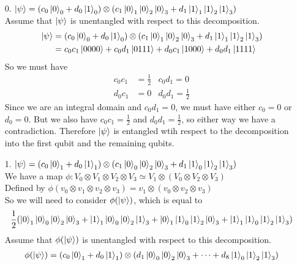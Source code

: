 \documentclass[11pt]{article}
\def\haf{\frac{1}{2}}
\begin{document}
\begin{itemize}
    \begin{enumerate}
        \item[0.] $\ket{\psi} = (c_0\ket{0}_0 + d_0\ket{1}_0) \otimes (c_1\ket{0}_1\ket{0}_2\ket{0}_3 + d_1\ket{1}_1\ket{1}_2\ket{1}_3)$ \\
            Assume that $\ket{\psi}$ is unentangled with respect to this decomposition.
            \begin{align*} 
                \ket{\psi} 
                &= (c_0\ket{0}_0 + d_0\ket{1}_0) \otimes (c_1\ket{0}_1\ket{0}_2\ket{0}_3 + d_1\ket{1}_1\ket{1}_2\ket{1}_3) \\
                &= c_0c_1\ket{0000} + c_0d_1\ket{0111}  + d_0c_1\ket{1000} + d_0d_1\ket{1111}
            \end{align*}
            So we must have
            \begin{align*}
                c_0c_1 &= \haf & c_0d_1 = 0 \\
                d_0c_1 &= 0 & d_0d_1 = \haf 
            \end{align*}
            Since we are an integral domain and $c_0d_1 = 0$, we must have either $c_0 = 0$ or $d_0 = 0$. 
            But we also have $c_0c_1 = \haf$ and $d_0d_1 = \haf$, so either way we have a contradiction.
            Therefore $\ket{\psi}$ is entangled wtih respect to the decomposition into the first qubit and the remaining qubits.
            \newpage
        \item[1.]
        $\ket{\psi} = (c_0\ket{0}_1 + d_0\ket{1}_1) 
        \otimes (c_1\ket{0}_0\ket{0}_2\ket{0}_3 + d_1\ket{1}_0\ket{1}_2\ket{1}_3)$ \\
            We have a map $\phi : V_0 \otimes V_1 \otimes V_2 \otimes V_3 \simeq V_1 \otimes (V_0 \otimes V_2 \otimes V_3)$ \\
            Defined by $\phi(v_0 \otimes v_1 \otimes v_2 \otimes v_3) = v_1 \otimes (v_0 \otimes v_2 \otimes v_3) $ \\
            So we will need to consider $\phi(\ket{\psi})$, which is equal to 
            $$\haf(\ket{0}_1\ket{0}_0\ket{0}_2\ket{0}_3 + \ket{1}_1\ket{0}_0\ket{0}_2\ket{1}_3 + \ket{0}_1\ket{1}_0\ket{1}_2\ket{0}_3 + \ket{1}_1 \ket{1}_0\ket{1}_2\ket{1}_3)$$
            Assume that $\phi(\ket{\psi})$ is unentangled with respect to this decomposition.
            \begin{align*}
                \phi(\ket{\psi})
                &= (c_0\ket{0}_1 + d_0\ket{1}_1) \otimes (d_1\ket{0}_0\ket{0}_2\ket{0}_3 + \cdots + d_8\ket{1}_0\ket{1}_2\ket{1}_3) \\

\end{align*}
\end{enumerate}
\end{itemize}
\end{document}
